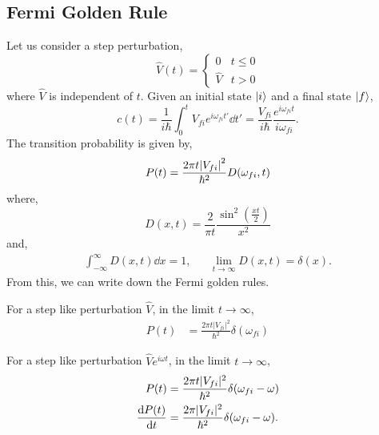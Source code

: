 \documentclass{book}
\begin{document}
\subsection{Fermi Golden Rule}
Let us consider a step perturbation,
\begin{equation}
	\hat{V}(t) = \begin{cases}
		0 & t \leq 0 \\
		\hat{V} & t > 0
	\end{cases}
\end{equation}
where $\hat{V}$ is independent of $t$. Given an initial state $\ket{i}$ and a final state $\ket{f}$,
\begin{equation}
	c(t) = \frac{1}{i\hbar}\int_0^tV_{fi}e^{i\omega_{fi}t'}\dd{t'} = \frac{V_{fi}}{i\hbar}\frac{e^{i\omega_{fi}t}}{i\omega_{fi}}.
\end{equation}
The transition probability is given by,
\begin{equation}
	P(t) = \frac{2\pi t\abs{V_{fi}}^2}{\hbar^2}D(\omega_{fi}, t)
\end{equation}
where,
\begin{equation}
	D(x,t) = \frac{2}{\pi t} \frac{\sin^2\left(\frac{xt}{2}\right)}{x^2}
\end{equation}
and,
\begin{align}
	\int_{-\infty}^{\infty}D(x,t)\dd{x} = 1, && \lim_{t \to \infty} D(x,t) = \delta (x).
\end{align}
From this, we can write down the Fermi golden rules.
\begin{tcolorbox}[colback=blue!5!white,colframe=blue!75!black,width=\textwidth,title = {\textbf{Fermi Golden Rule} - Step Perturbation}]
	For a step like perturbation $\hat{V}$, in the limit $t \to \infty$,
	\begin{align}
		P(t) &= \frac{2\pi t|V_{fi}|^2}{\hbar^2}\delta(\omega_{fi})
	\end{align}
\end{tcolorbox}
\begin{tcolorbox}[colback=blue!5!white,colframe=blue!75!black,width=\textwidth,title = {\textbf{Fermi Golden Rule} - Oscillatory Perturbation}]
	For a step like perturbation $\hat{V}e^{i\omega t}$, in the limit $t \to \infty$,
	\begin{align}
		P(t) &= \frac{2\pi t|V_{fi}|^2}{\hbar^2}\delta(\omega_{fi} - \omega) \\
		\dv{P(t)}{t} &= \frac{2\pi|V_{fi}|^2}{\hbar^2} \delta(\omega_{fi} - \omega).
	\end{align}
\end{tcolorbox}
\end{document}

